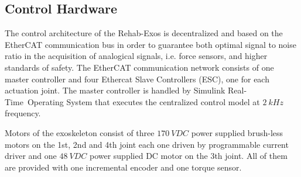 {%
}
\DIFdelend \DIFaddbegin {}\DIFaddend %
\subsection{Control Hardware}
The control architecture of the Rehab-Exos is decentralized and based on the EtherCAT communication bus in order to guarantee both optimal signal to noise ratio in the acquisition of analogical signals, i.e. force sensors, and higher standards of safety.
The EtherCAT communication network consists of one master controller and four Ethercat Slave Controllers (ESC), one for each actuation joint.
The master controller is handled by Simulink Real-Time\texttrademark \ Operating System that executes the centralized control model at $2 \ kHz$ frequency.

Motors of the exoskeleton consist of three $170 \ VDC$ power supplied brush-less motors on the 1st, 2nd and 4th joint each one driven by programmable current driver and one $48 \ VDC$ power supplied DC motor on the 3th joint.  All of them are provided with one incremental encoder and one torque sensor.

